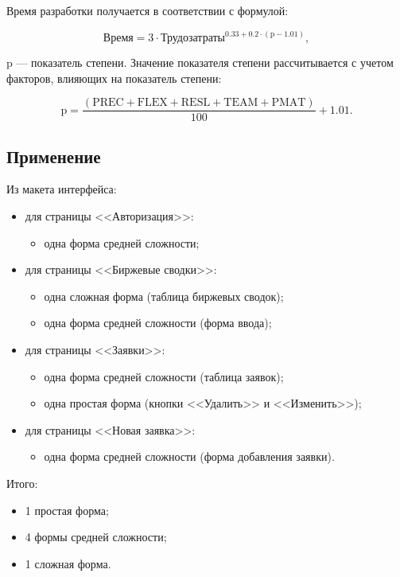 Время разработки получается в соответствии с формулой:

$$\text{Время} = 3 \cdot \text{Трудозатраты}^{0.33 + 0.2 \cdot (\text{p} - 1.01)},$$

 $\text{p}$ --- показатель степени. Значение показателя степени рассчитывается с учетом факторов, влияющих на показатель степени:

$$\text{p} = \frac{(\text{PREC} + \text{FLEX} + \text{RESL} + \text{TEAM} + \text{PMAT})}{100} + 1.01.$$

\subsection{Применение}

Из макета интерфейса:

\begin{itemize}
    \item для страницы <<Авторизация>>:
        \begin{itemize}
            \item одна форма средней сложности;
        \end{itemize}
    \item для страницы <<Биржевые сводки>>:
        \begin{itemize}
            \item одна сложная форма (таблица биржевых сводок);
            \item одна форма средней сложности (форма ввода);
        \end{itemize}
    \item для страницы <<Заявки>>:
        \begin{itemize}
            \item одна форма средней сложности (таблица заявок);
            \item одна простая форма (кнопки <<Удалить>> и <<Изменить>>);
        \end{itemize}
    \item для страницы <<Новая заявка>>:
        \begin{itemize}
            \item одна форма средней сложности (форма добавления заявки).
        \end{itemize}
\end{itemize}

Итого:

\begin{itemize}
    \item 1 простая форма;
    \item 4 формы средней сложности;
    \item 1 сложная форма.
\end{itemize}

